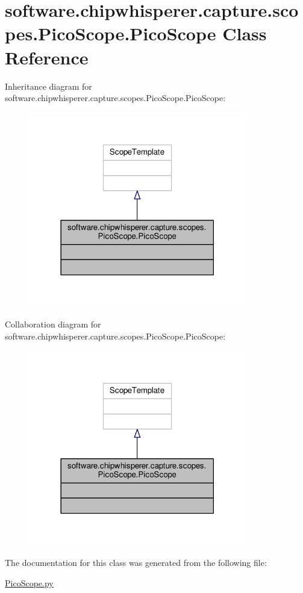 \hypertarget{classsoftware_1_1chipwhisperer_1_1capture_1_1scopes_1_1PicoScope_1_1PicoScope}{}\section{software.\+chipwhisperer.\+capture.\+scopes.\+Pico\+Scope.\+Pico\+Scope Class Reference}
\label{classsoftware_1_1chipwhisperer_1_1capture_1_1scopes_1_1PicoScope_1_1PicoScope}


Inheritance diagram for software.\+chipwhisperer.\+capture.\+scopes.\+Pico\+Scope.\+Pico\+Scope\+:\nopagebreak
\begin{figure}[H]
\begin{center}
\leavevmode
\includegraphics[width=270pt]{d6/dfb/classsoftware_1_1chipwhisperer_1_1capture_1_1scopes_1_1PicoScope_1_1PicoScope__inherit__graph}
\end{center}
\end{figure}


Collaboration diagram for software.\+chipwhisperer.\+capture.\+scopes.\+Pico\+Scope.\+Pico\+Scope\+:\nopagebreak
\begin{figure}[H]
\begin{center}
\leavevmode
\includegraphics[width=270pt]{df/d50/classsoftware_1_1chipwhisperer_1_1capture_1_1scopes_1_1PicoScope_1_1PicoScope__coll__graph}
\end{center}
\end{figure}


The documentation for this class was generated from the following file\+:\begin{DoxyCompactItemize}
\item 
\hyperlink{PicoScope_8py}{Pico\+Scope.\+py}\end{DoxyCompactItemize}
